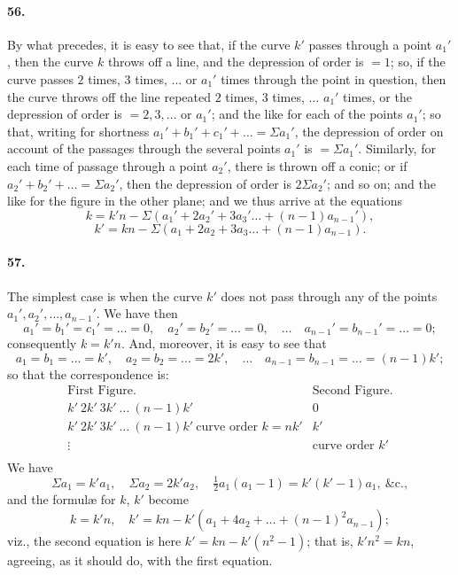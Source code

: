 \documentclass[11pt]{article}
\begin{document}
\paragraph{56.}
By what precedes, it is easy to see that, if the curve $k'$ passes
through a point $a_{1}'$, then the curve $k$ throws off a line, and the
depression of order is $=1$; so, if the curve passes $2$ times, $3$
times, $\ldots$ or $a_{1}'$ times through the point in question, then
the curve throws off the line repeated $2$ times, $3$ times, $\ldots$
$a_{1}'$ times, or the depression of order is $=2,3,\ldots$ or $a_{1}'$;
and the like for each of the points $a_{1}'$; so that, writing for
shortness $a_{1}'+b_{1}'+c_{1}'+\ldots=\Sigma a_{1}'$, the depression of
order on account of the passages through the several points $a_{1}'$ is
$=\Sigma a_{1}'$. Similarly, for each time of passage through a point
$a_{2}'$, there is thrown off a conic; or if
$a_{2}'+b_{2}'+\ldots=\Sigma a_{2}'$, then the depression of order is
$2\Sigma a_{2}'$; and so on; and the like for the figure in the other
plane; and we thus arrive at the equations
\[
k = k'n - \Sigma(a_{1}' + 2a_{2}' + 3a_{3}'\ldots + (n-1)a_{n-1}'),
\]
\[
k' = kn - \Sigma(a_{1} + 2a_{2} + 3a_{3}\ldots + (n-1)a_{n-1}).
\]

\medskip

\paragraph{57.}
The simplest case is when the curve $k'$ does not pass through any of the
points $a_{1}', a_{2}', \ldots, a_{n-1}'$. We have then
\[
a_{1}'=b_{1}'=c_{1}'=\ldots=0,\quad
a_{2}'=b_{2}'=\ldots=0,\quad \ldots\quad
a_{n-1}'=b_{n-1}'=\ldots=0;
\]
consequently $k=k'n$. And, moreover, it is easy to see that
\[
a_{1}=b_{1}=\ldots=k',\quad a_{2}=b_{2}=\ldots=2k',\quad \ldots\quad
a_{n-1}=b_{n-1}=\ldots=(n-1)k';
\]
so that the correspondence is:
\[
\begin{array}{l|l}
\text{First Figure.} & \text{Second Figure.}\\[2pt]
k'\ 2k'\ 3k'\ \ldots\ (n-1)k' & 0\\
k'\ 2k'\ 3k'\ \ldots\ (n-1)k'\ \text{curve order }k=nk' & k'\\
\vdots & \text{curve order }k'\\
\end{array}
\]
We have
\[
\Sigma a_{1}=k'a_{1},\quad \Sigma a_{2}=2k'a_{2},\quad
\tfrac{1}{2}a_{1}(a_{1}-1)=k'(k'-1)a_{1},\ \&\mathrm{c.},
\]
and the formul\ae{} for $k$, $k'$ become
\[
k=k'n,\quad k'=kn-k'(a_{1}+4a_{2}+\ldots+(n-1)^{2}a_{n-1});
\]
viz., the second equation is here $k'=kn-k'(n^{2}-1)$; that is,
$k'n^{2}=kn$, agreeing, as it should do, with the first equation.
\end{document}

